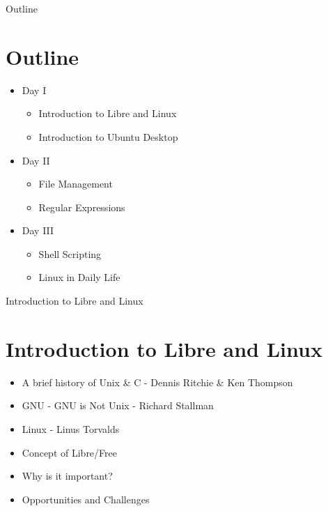 \documentclass[aspectratio=169,10pt]{beamer}
\begin{document}
	\begin{frame}{Outline}
		\section{Outline}
		\begin{itemize}
			\item Day I
			\begin{itemize}
				\item Introduction to Libre and Linux
				\item Introduction to Ubuntu Desktop
			\end{itemize}
			\item Day II
				\begin{itemize}
					\item File Management
					\item Regular Expressions
				\end{itemize}		
			\item Day III
				\begin{itemize}
					\item Shell Scripting
					\item Linux in Daily Life
				\end{itemize}
		\end{itemize}
	\end{frame}
	
	\begin{frame}{Introduction to Libre and Linux}
		\section{Introduction to Libre and Linux}
		\begin{itemize}
			\item A brief history of Unix \& C - Dennis Ritchie \& Ken Thompson
			\item GNU - GNU is Not Unix - Richard Stallman
			\item Linux - Linus Torvalds
            \item Concept of Libre/Free
			\item Why is it important? 
            \item Opportunities and Challenges
		\end{itemize}
		
	\end{frame}
\end{document}
